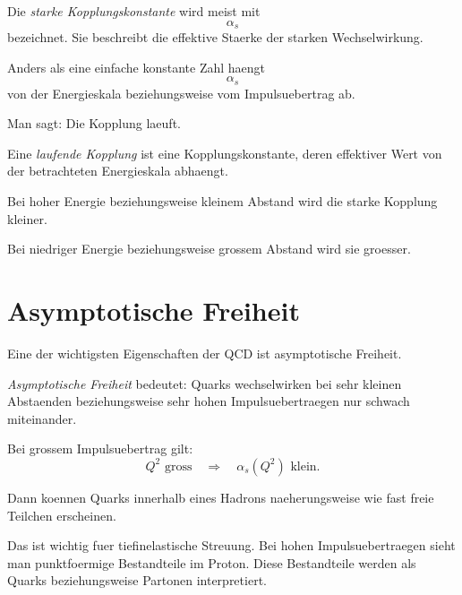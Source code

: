 \begin{definitionbox}
Die \emph{starke Kopplungskonstante} wird meist mit
\[
    \alpha_s
\]
bezeichnet.
Sie beschreibt die effektive Staerke der starken Wechselwirkung.
\end{definitionbox}

\begin{conceptbox}
Anders als eine einfache konstante Zahl haengt
\[
    \alpha_s
\]
von der Energieskala beziehungsweise vom Impulsuebertrag ab.

Man sagt:
Die Kopplung laeuft.
\end{conceptbox}

\begin{definitionbox}
Eine \emph{laufende Kopplung} ist eine Kopplungskonstante, deren effektiver Wert von
der betrachteten Energieskala abhaengt.
\end{definitionbox}

\begin{examtipbox}
Bei hoher Energie beziehungsweise kleinem Abstand wird die starke Kopplung kleiner.

Bei niedriger Energie beziehungsweise grossem Abstand wird sie groesser.
\end{examtipbox}

\section{Asymptotische Freiheit}

Eine der wichtigsten Eigenschaften der QCD ist asymptotische Freiheit.

\begin{definitionbox}
\emph{Asymptotische Freiheit} bedeutet:
Quarks wechselwirken bei sehr kleinen Abstaenden beziehungsweise sehr hohen
Impulsuebertraegen nur schwach miteinander.
\end{definitionbox}

\begin{conceptbox}
Bei grossem Impulsuebertrag gilt:
\[
    Q^2 \text{ gross}
    \quad\Rightarrow\quad
    \alpha_s(Q^2) \text{ klein}.
\]

Dann koennen Quarks innerhalb eines Hadrons naeherungsweise wie fast freie Teilchen
erscheinen.
\end{conceptbox}

\begin{notebox}
Das ist wichtig fuer tiefinelastische Streuung.
Bei hohen Impulsuebertraegen sieht man punktfoermige Bestandteile im Proton.
Diese Bestandteile werden als Quarks beziehungsweise Partonen interpretiert.
\end{notebox}

